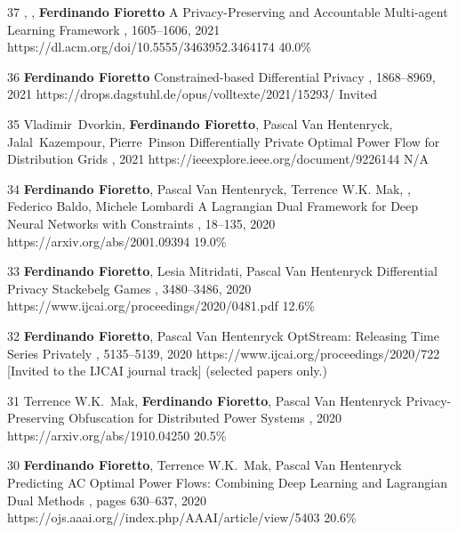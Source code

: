 \begin{pubs}
    \confentry
    {37} %
    {, , {\bf Ferdinando Fioretto}}
    {A Privacy-Preserving and Accountable Multi-agent Learning Framework}
    {\procAAMAS, 1605--1606, 2021}
    {https://dl.acm.org/doi/10.5555/3463952.3464174}
    {40.0\%}

	\confentry
	{36} %
	{\bf Ferdinando Fioretto}
	{Constrained-based Differential Privacy}
	{\procCP, 1868--8969, 2021}
	{https://drops.dagstuhl.de/opus/volltexte/2021/15293/}
	{Invited}
	
	\confentry 
	{35} %
	{Vladimir~Dvorkin, {\bf Ferdinando Fioretto}, Pascal Van Hentenryck, Jalal~Kazempour, Pierre~Pinson}
	{Differentially Private Optimal Power Flow for Distribution Grids}
	{, 2021}
	{https://ieeexplore.ieee.org/document/9226144}
	{N/A} %

	\confentry
		{34} %
		{{\bf Ferdinando Fioretto}, Pascal Van Hentenryck, Terrence W.K. Mak, , Federico Baldo, Michele Lombardi} 
		{A Lagrangian Dual Framework for Deep Neural Networks with Constraints}
		{\procECML, 18--135, 2020}
		{https://arxiv.org/abs/2001.09394}
		{19.0\%}

	\confentry
		{33} %
		{{\bf Ferdinando Fioretto}, Lesia Mitridati, Pascal Van Hentenryck}
		{Differential Privacy Stackebelg Games}
		{\procIJCAI, 3480--3486, 2020}
		{https://www.ijcai.org/proceedings/2020/0481.pdf}
	    {12.6\%}

	\confentryAwd
		{32} %
		{{\bf Ferdinando Fioretto}, Pascal Van Hentenryck}
		{OptStream: Releasing Time Series Privately}
		{\procIJCAI, 5135--5139, 2020}
	    {https://www.ijcai.org/proceedings/2020/722}
		{[Invited to the IJCAI journal track]}
		{(selected papers only.)}{}
	
	\confentry
		{31} %
		{Terrence W.K.~Mak, {\bf Ferdinando Fioretto}, Pascal Van Hentenryck}
		{Privacy-Preserving Obfuscation for Distributed Power Systems}
		{\procPSCC, 2020}
		{https://arxiv.org/abs/1910.04250}
	    {20.5\%} %

	\confentry
		{30} %
		{{\bf Ferdinando Fioretto}, Terrence W.K.~Mak, Pascal Van Hentenryck}
		{Predicting AC Optimal Power Flows: Combining Deep Learning and Lagrangian Dual Methods}
	  	{\procAAAI, pages 630--637, 2020}
	  	{https://ojs.aaai.org//index.php/AAAI/article/view/5403}
	    {20.6\%} %


\end{pubs}
